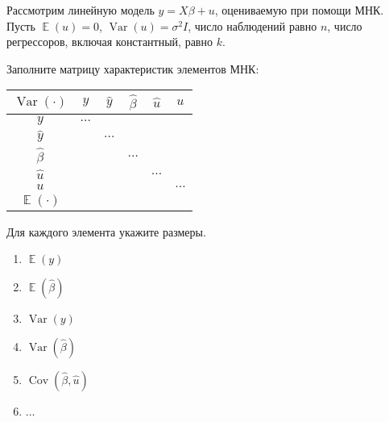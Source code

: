 \documentclass[10pt, a4paper]{extarticle}
\DeclareMathOperator{\cov}{Cov}
\DeclareMathOperator{\Var}{Var}
\DeclareMathOperator{\E}{\mathbb{E}}
\begin{document}
	Рассмотрим линейную модель $y = X\beta + u$, оцениваемую при помощи МНК. Пусть $\E(u) = 0$, $\Var(u) = \sigma^2 I$, число наблюдений равно $n$, число регрессоров, включая константный, равно $k$. 

	Заполните матрицу характеристик элементов МНК:
	\begin{center}
	\begin{tabular}{c|ccccc}
		$\Var(\cdot)$ & $y$ & $\hat{y}$ & $\hat{\beta}$ & $\hat{u}$ & $u$ \\
		\hline
		$y$ & $\ldots$ &&&& \\
		$\hat{y}$ &&$\ldots$&&& \\
		$\hat{\beta}$ &&&$\ldots$&& \\
		$\hat{u}$ &&&&$\ldots$& \\
		$u$ &&&&&$\ldots$ \\
		\hline
		$\E(\cdot)$ &&&&& \\
		\hline
	\end{tabular}
\end{center}

	Для каждого элемента укажите размеры.

	\begin{enumerate}[label = \alph*)]
		\item $\E(y)$
		\item $\E(\hat{\beta})$
		\item $\Var(y)$
		\item $\Var(\hat{\beta})$
		\item $\cov(\hat{\beta}, \hat{u})$
		\item $\ldots$
	\end{enumerate}
	
\end{document}
